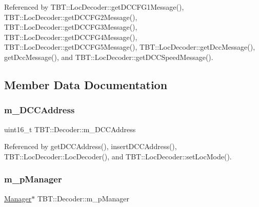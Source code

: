 Referenced by T\+B\+T\+::\+Loc\+Decoder\+::get\+D\+C\+C\+F\+G1\+Message(), T\+B\+T\+::\+Loc\+Decoder\+::get\+D\+C\+C\+F\+G2\+Message(), T\+B\+T\+::\+Loc\+Decoder\+::get\+D\+C\+C\+F\+G3\+Message(), T\+B\+T\+::\+Loc\+Decoder\+::get\+D\+C\+C\+F\+G4\+Message(), T\+B\+T\+::\+Loc\+Decoder\+::get\+D\+C\+C\+F\+G5\+Message(), T\+B\+T\+::\+Loc\+Decoder\+::get\+Dcc\+Message(), get\+Dcc\+Message(), and T\+B\+T\+::\+Loc\+Decoder\+::get\+D\+C\+C\+Speed\+Message().



\subsection{Member Data Documentation}
\mbox{\label{classTBT_1_1Decoder_a14309179167dd46b722982301d651c4d_a14309179167dd46b722982301d651c4d}} 
\subsubsection{\texorpdfstring{m\+\_\+\+D\+C\+C\+Address}{m\_DCCAddress}}
{\footnotesize\ttfamily uint16\+\_\+t T\+B\+T\+::\+Decoder\+::m\+\_\+\+D\+C\+C\+Address\hspace{0.3cm}{\ttfamily [protected]}}



Referenced by get\+D\+C\+C\+Address(), insert\+D\+C\+C\+Address(), T\+B\+T\+::\+Loc\+Decoder\+::\+Loc\+Decoder(), and T\+B\+T\+::\+Loc\+Decoder\+::set\+Loc\+Mode().

\mbox{\label{classTBT_1_1Decoder_a400475d21ba933f8b91e6f7d3053518b_a400475d21ba933f8b91e6f7d3053518b}} 
\subsubsection{\texorpdfstring{m\+\_\+p\+Manager}{m\_pManager}}
{\footnotesize\ttfamily \hyperlink{classTBT_1_1Manager}{Manager}$\ast$ T\+B\+T\+::\+Decoder\+::m\+\_\+p\+Manager\hspace{0.3cm}{\ttfamily [protected]}}




